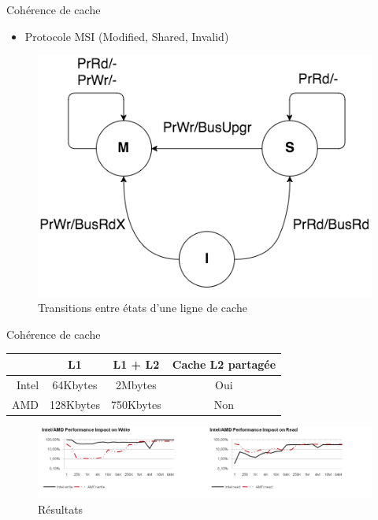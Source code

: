 \documentclass{beamer}
\begin{document}
\begin{frame}{Cohérence de cache}
	\begin{itemize}
		\item Protocole MSI (Modified, Shared, Invalid)
	\end{itemize}
	\begin{figure}
		\centering
		\includegraphics[width=0.6\linewidth]{State_diagram_for_processor_transactions.png}
		\caption{Transitions entre états d'une ligne de cache \cite{wiki:MSI_protocol}}
		\label{fig:State_di}
	\end{figure}
\end{frame}

\begin{frame}{Cohérence de cache}

	

	\begin{center}
		\begin{tabular}{r|ccc}
		& L1 & L1 + L2 & Cache L2 partagée \\
		\hline
			Intel & 64Kbytes & 2Mbytes & Oui \\
			AMD & 128Kbytes & 750Kbytes & Non \\
		\end{tabular}
	\end{center}

	\begin{figure}
		\centering
		\includegraphics[width=0.9\paperwidth]{results_performance_coherency.png}
		\caption{Résultats \cite{Fuch}}
		\label{fig:results_cache_sharing}
	\end{figure}	
\end{frame}
\end{document}
